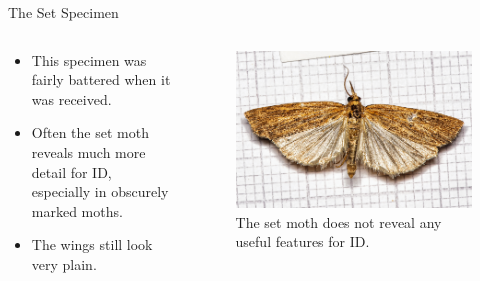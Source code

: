 \documentclass[
  ignorenonframetext,
]{beamer}
\providecommand{\tightlist}{%
  \setlength{\itemsep}{0pt}\setlength{\parskip}{0pt}}
\begin{document}
\begin{frame}{The Set Specimen}
\protect\hypertarget{the-set-specimen}{}
\begin{columns}[T]
\begin{column}{0.5\textwidth}
\begin{itemize}
\tightlist
\item
  This specimen was fairly battered when it was received.
\item
  Often the set moth reveals much more detail for ID, especially in
  obscurely marked moths.
\item
  The wings still look very plain.
\end{itemize}
\end{column}

\begin{column}{0.5\textwidth}
\begin{figure}
\centering
\includegraphics{./images/PJP20220218-0001a.jpg}
\caption{The set moth does not reveal any useful features for ID.}
\end{figure}
\end{column}
\end{columns}
\end{frame}
\end{document}
